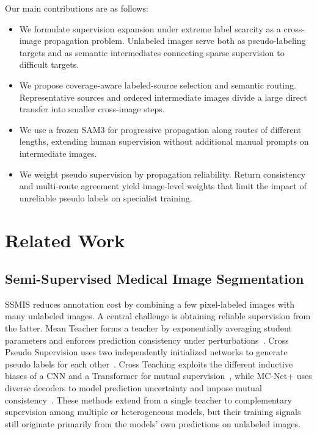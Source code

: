 \documentclass[a4paper,fleqn]{cas-dc}
\begin{document}
Our main contributions are as follows:
\begin{itemize}
\item We formulate supervision expansion under extreme label scarcity as a cross-image propagation problem. Unlabeled images serve both as pseudo-labeling targets and as semantic intermediates connecting sparse supervision to difficult targets.
\item We propose coverage-aware labeled-source selection and semantic routing. Representative sources and ordered intermediate images divide a large direct transfer into smaller cross-image steps.
\item We use a frozen SAM3 for progressive propagation along routes of different lengths, extending human supervision without additional manual prompts on intermediate images.
\item We weight pseudo supervision by propagation reliability. Return consistency and multi-route agreement yield image-level weights that limit the impact of unreliable pseudo labels on specialist training.
\end{itemize}

\section{Related Work}

\subsection{Semi-Supervised Medical Image Segmentation}

SSMIS reduces annotation cost by combining a few pixel-labeled images with many unlabeled images. A central challenge is obtaining reliable supervision from the latter. Mean Teacher forms a teacher by exponentially averaging student parameters and enforces prediction consistency under perturbations~\cite{tarvainen2017meanteacher}. Cross Pseudo Supervision uses two independently initialized networks to generate pseudo labels for each other~\cite{chen2021cps}. Cross Teaching exploits the different inductive biases of a CNN and a Transformer for mutual supervision~\cite{luo2022crossteaching}, while MC-Net+ uses diverse decoders to model prediction uncertainty and impose mutual consistency~\cite{wu2022mcnet}. These methods extend from a single teacher to complementary supervision among multiple or heterogeneous models, but their training signals still originate primarily from the models' own predictions on unlabeled images.
\end{document}
